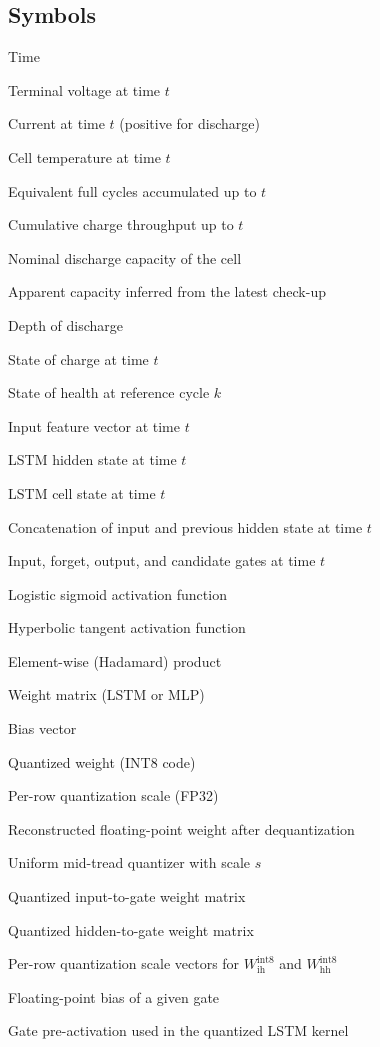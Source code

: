 \documentclass[review]{elsarticle}
\begin{document}
\subsection*{Symbols}
\begin{description}[style=multiline,leftmargin=1.5cm,font=\bfseries]
\item[$t$] Time
\item[$U(t)$] Terminal voltage at time $t$
\item[$I(t)$] Current at time $t$ (positive for discharge)
\item[$T(t)$] Cell temperature at time $t$
\item[$\mathrm{EFC}(t)$] Equivalent full cycles accumulated up to $t$
\item[$Q_c(t)$] Cumulative charge throughput up to $t$
\item[$C_{\mathrm{nom}}$] Nominal discharge capacity of the cell
\item[$C_{\mathrm{app}}$] Apparent capacity inferred from the latest check-up
\item[$\mathrm{DoD}$] Depth of discharge
\item[$\mathrm{SOC}(t)$] State of charge at time $t$
\item[$\mathrm{SOH}_k$] State of health at reference cycle $k$
\item[$\mathbf{x}_t$] Input feature vector at time $t$
\item[$\mathbf{h}_t$] LSTM hidden state at time $t$
\item[$\mathbf{c}_t$] LSTM cell state at time $t$
\item[$\mathbf{z}_t$] Concatenation of input and previous hidden state at time $t$
\item[$\mathbf{i}_t,\mathbf{f}_t,\mathbf{o}_t,\mathbf{g}_t$] Input, forget, output, and candidate gates at time $t$
\item[$\sigma(\cdot)$] Logistic sigmoid activation function
\item[$\tanh(\cdot)$] Hyperbolic tangent activation function
\item[$\odot$] Element-wise (Hadamard) product
\item[$W$] Weight matrix (LSTM or MLP)
\item[$b$] Bias vector
\item[$q$] Quantized weight (INT8 code)
\item[$s$] Per-row quantization scale (FP32)
\item[$\hat{w}$] Reconstructed floating-point weight after dequantization
\item[$\mathcal{Q}_s(\cdot)$] Uniform mid-tread quantizer with scale $s$
\item[$W_{\mathrm{ih}}^{\mathrm{int8}}$] Quantized input-to-gate weight matrix
\item[$W_{\mathrm{hh}}^{\mathrm{int8}}$] Quantized hidden-to-gate weight matrix
\item[$s_{\mathrm{ih}}, s_{\mathrm{hh}}$] Per-row quantization scale vectors for $W_{\mathrm{ih}}^{\mathrm{int8}}$ and $W_{\mathrm{hh}}^{\mathrm{int8}}$
\item[$b_{\mathrm{fp32}}$] Floating-point bias of a given gate
\item[$g$] Gate pre-activation used in the quantized LSTM kernel
\end{description}
\end{document}
